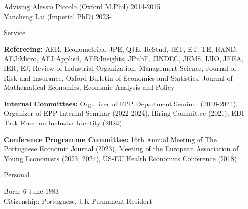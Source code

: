 \documentclass{resume}
\begin{document}
\begin{rSection}{Advising}
	Alessio Piccolo (Oxford M.Phil) \hfill {2014-2015} \\
	Yancheng Lai (Imperial PhD) \hfill {2023-}		
\end{rSection}




\begin{rSection}{Service}

\textbf{Refereeing:} AER, Econometrica, JPE, QJE, ReStud, JET, ET, TE, RAND, AEJ:Micro, AEJ:Applied, AER:Insights, JPubE, JINDEC, JEMS, IJIO, JEEA, IER, EJ, Review of Industrial Organization, Management Science, Journal of Risk and Insurance, Oxford Bulletin of Economics and Statistics, Journal of Mathematical Economics, Economic Analysis and Policy


\textbf{Internal Committees:} Organizer of EPP Department Seminar (2018-2024), Organizer of EPP Internal Seminar  (2022-2024),  Hiring Committee (2021), EDI Task Force on Inclusive Identity (2024)

\textbf{Conference Programme Committee:} 16th Annual Meeting of The Portuguese Economic Journal (2023), Meeting of the European Association of Young Economists (2023, 2024), US-EU Health Economics Conference (2018)
	
\end{rSection}




\begin{rSection}{Personal}

Born: 6 June 1983
\\ Citizenship: Portuguese, UK Permanent Resident

\end{rSection}
\end{document}
